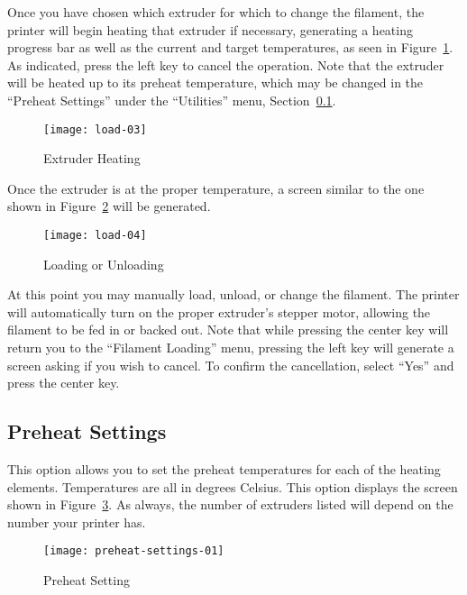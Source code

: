 Once you have chosen which extruder for which to change the filament, the printer will begin heating that extruder if necessary, generating a heating progress bar as well as the current and target temperatures, as seen in Figure~\ref{fig:filheat}.  As indicated, press the left key to cancel the operation.  Note that the extruder will be heated up to its preheat temperature, which may be changed in the ``Preheat Settings'' under the ``Utilities'' menu, Section~\ref{sec:preheatset}.

\begin{figure}[!htbp]
  \centering
    \texttt{[image: load-03]}
    \caption{Extruder Heating}
  \label{fig:filheat}
\end{figure}

Once the extruder is at the proper temperature, a screen similar to the one shown in Figure~\ref{fig:filpro} will be generated.

\begin{figure}[!htbp]
  \centering
    \texttt{[image: load-04]}
    \caption{Loading or Unloading}
  \label{fig:filpro}
\end{figure}

At this point you may manually load, unload, or change the filament.  The printer will automatically turn on the proper extruder's stepper motor, allowing the filament to be fed in or backed out.  Note that while pressing the center key will return you to the ``Filament Loading'' menu, pressing the left key will generate a screen asking if you wish to cancel.  To confirm the cancellation, select ``Yes'' and press the center key.


\subsection{Preheat Settings} \label{sec:preheatset}

This option allows you to set the preheat temperatures for each of the heating elements.  Temperatures are all in degrees Celsius.  This option displays the screen shown in Figure~\ref{fig:preset}.  As always, the number of extruders listed will depend on the number your printer has.

 \begin{figure}[!htbp]
  \centering
    \texttt{[image: preheat-settings-01]}
    \caption{Preheat Setting}
  \label{fig:preset}
\end{figure}

